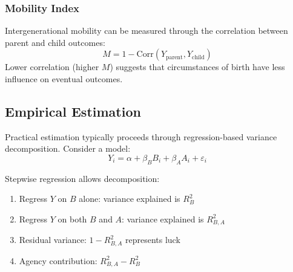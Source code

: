   \subsubsection{Mobility Index}

  Intergenerational mobility can be measured through the correlation between
  parent and child outcomes:
  \begin{equation}
    M = 1 - \text{Corr}(Y_{\text{parent}}, Y_{\text{child}})
  \end{equation}
  Lower correlation (higher $M$) suggests that circumstances of birth
  have less influence on eventual outcomes.

  \subsection{Empirical Estimation}

  Practical estimation typically proceeds through regression-based variance
  decomposition. Consider a model:
  \begin{equation}
    Y_{i} = \alpha + \beta_{B} B_{i} + \beta_{A} A_{i} + \varepsilon_{i}
  \end{equation}

  Stepwise regression allows decomposition:
  \begin{enumerate}
    \item Regress $Y$ on $B$ alone: variance explained is $R^{2}_{B}$

    \item Regress $Y$ on both $B$ and $A$: variance explained is
      $R^{2}_{B,A}$

    \item Residual variance: $1 - R^{2}_{B,A}$ represents luck

    \item Agency contribution: $R^{2}_{B,A}- R^{2}_{B}$
  \end{enumerate}

